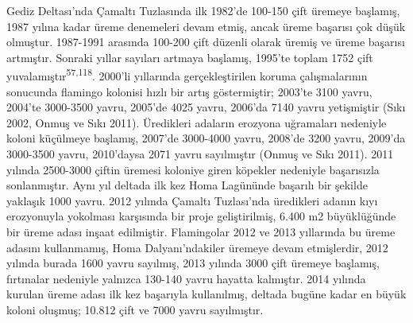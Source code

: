\documentclass[
  letterpaper,
  DIV=11,
  numbers=noendperiod]{scrreprt}
\begin{document}
Gediz Deltası'nda Çamaltı Tuzlasında ilk 1982'de 100-150 çift üremeye
başlamış, 1987 yılına kadar üreme denemeleri devam etmiş, ancak üreme
başarısı çok düşük olmuştur. 1987-1991 arasında 100-200 çift düzenli
olarak üremiş ve üreme başarısı artmıştır. Sonraki yıllar sayıları
artmaya başlamış, 1995'te toplam 1752 çift
yuvalamıştır\textsuperscript{57,118}. 2000'li yıllarında
gerçekleştirilen koruma çalışmalarının sonucunda flamingo kolonisi hızlı
bir artış göstermiştir; 2003'te 3100 yavru, 2004'te 3000-3500 yavru,
2005'de 4025 yavru, 2006'da 7140 yavru yetişmiştir (Sıkı 2002, Onmuş ve
Sıkı 2011). Üredikleri adaların erozyona uğramaları nedeniyle koloni
küçülmeye başlamış, 2007'de 3000-4000 yavru, 2008'de 3200 yavru, 2009'da
3000-3500 yavru, 2010'daysa 2071 yavru sayılmıştır (Onmuş ve Sıkı 2011).
2011 yılında 2500-3000 çiftin üremesi koloniye giren köpekler nedeniyle
başarısızla sonlanmıştır. Aynı yıl deltada ilk kez Homa Lagününde
başarılı bir şekilde yaklaşık 1000 yavru. 2012 yılında Çamaltı
Tuzlası'nda üredikleri adanın kıyı erozyonuyla yokolması karşısında bir
proje geliştirilmiş, 6.400 m2 büyüklüğünde bir üreme adası inşaat
edilmiştir. Flamingolar 2012 ve 2013 yıllarında bu üreme adasını
kullanmamış, Homa Dalyanı'ndakiler üremeye devam etmişlerdir, 2012
yılında burada 1600 yavru sayılmış, 2013 yılında 3000 çift üremeye
başlamış, fırtınalar nedeniyle yalnızca 130-140 yavru hayatta kalmıştır.
2014 yılında kurulan üreme adası ilk kez başarıyla kullanılmış, deltada
bugüne kadar en büyük koloni oluşmuş; 10.812 çift ve 7000 yavru
sayılmıştır.
\end{document}
